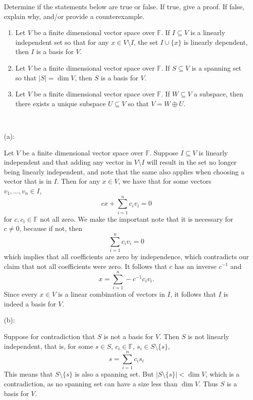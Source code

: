\documentclass{article}
\theoremstyle{plain} %
\numberwithin{thm}{section} %
\theoremstyle{definition}
\begin{document}
    \newpage
    \begin{question}{11}
        Determine if the statements below are true or false. If true, give a proof. If false, explain why, and/or provide a counterexample.
        
        \begin{enumerate}[label=(\alph*)]
            \item Let \( V \) be a finite dimensional vector space over \( \mathbb{F} \). If \( I \subseteq V \) is a linearly independent set so that for any \( x \in V \setminus I \), the set \( I \cup \{ x \} \) is linearly dependent, then \( I \) is a basis for \( V \).
            \item Let \( V \) be a finite dimensional vector space over \( \mathbb{F} \). If \( S \subseteq V \) is a spanning set so that \( |S| = \dim V \), then \( S \) is a basis for \( V \).
            \item Let \( V \) be a finite dimensional vector space over \( \mathbb{F} \). If \( W \subseteq V \) a subspace, then there exists a unique subspace \( U \subseteq V \) so that \( V = W \oplus U \).
        \end{enumerate}
        \tcblower
        \ 

        (a):

        Let \(V\) be a finite dimensional vector space over \(\mathbb{F}\). Suppose \(I \subseteq V\) is linearly independent and that adding any vector in \(V\setminus I\) will result in the set no longer being linearly independent, and note that the same also applies when choosing a vector that is in \(I\). Then for any \(x \in V\), we have that for some vectors \(v_1, ..., v_n \in I\),
        \[
            cx + \sum_{i=1}^{n} c_i v_i = 0
        \]
        for \(c, c_i \in \mathbb{F}\) not all zero. We make the important note that it is necessary for \(c \neq 0\), because if not, then
        \[
            \sum_{i=1}^{n} c_i v_i = 0
        \]
        which implies that all coefficients are zero by independence, which contradicts our claim that not all coefficients were zero. It follows that \(c\) has an inverse \(c^{-1}\) and
        \[
            x = \sum_{i=1}^{n} -c^{-1}c_i v_i.
        \]
        Since every \(x \in V\) is a linear combination of vectors in \(I\), it follows that \(I\) is indeed a basis for \(V\).

        \medskip

        (b):

        Suppose for contradiction that \(S\) is not a basis for \(V\). Then \(S\) is not linearly independent, that is, for some \(s \in S\), \(c_i \in \mathbb{F}\), \(s_i \in S\setminus \{ s \}\),
        \[
            s = \sum_{i=1}^{n} c_i s_i
        \]
        This means that \(S\setminus \{ s \}\) is also a spanning set. But \(|S\setminus \{ s \} | < \dim V\), which is a contradiction, as no spanning set can have a size less than \(\dim V\). Thus \(S\) is a basis for \(V\).


\end{question}
\end{document}
